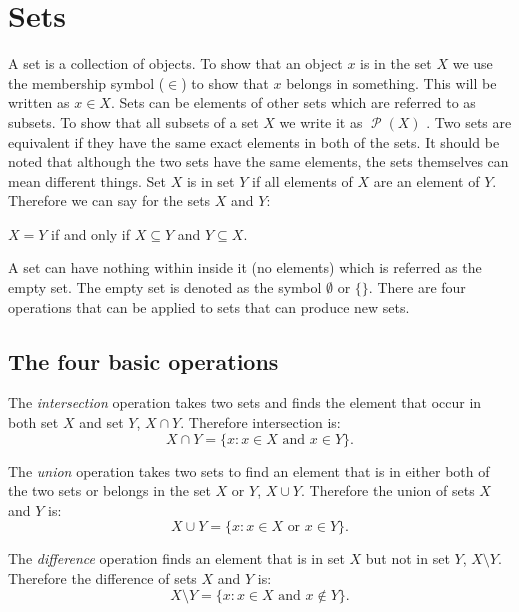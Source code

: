 \documentclass[11pt,a4paper]{article}
\DeclareMathOperator{\power}{\mathcal{P}}
\begin{document}
\section{Sets}
\label{sec:sets}

A set is a collection of objects. To show that an object $x$ is in the set $X$ we use the membership symbol ($\in$) to show that $x$ belongs in something. This will be written as $x \in X$. Sets can be elements of other sets which are referred to as subsets. To show that all subsets of a set $X$ we write it as $\power(X)$ \cite{Marek2009Introduction}. Two sets are equivalent if they have the same exact elements in both of the sets. It should be noted that although the two sets have the same elements, the sets themselves can mean different things. Set $X$ is in set $Y$ if all elements of $X$ are an element of $Y$.
Therefore we can say for the sets $X$ and $Y$:
\begin{center}
  $X=Y$ if and only if $X \subseteq Y$ and $Y \subseteq X$.
\end{center}
A set can have nothing within inside it (no elements) which is referred as the empty set. The empty set is denoted as the symbol $\emptyset$ or $\{\}$. There are four operations that can be applied to sets that can produce new sets.  

\subsection{The four basic operations}
\label{sec:fourbasop}

The \emph{intersection} operation takes two sets and finds the element that occur in both set $X$ and set $Y$, $X \cap Y$. Therefore intersection is:
\begin{displaymath}
  X \cap Y = \{x : x \in X  \text{ and } x \in Y\}.
\end{displaymath}

The \emph{union} operation takes two sets to find an element that is in either both of the two sets or belongs in the set $X$ or $Y$, $X \cup Y$. Therefore the union of sets $X$ and $Y$ is:
\begin{displaymath}
  X \cup Y = \{x : x \in X  \text{ or } x \in Y\}.
\end{displaymath}

The \emph{difference} operation finds an element that is in set $X$ but not in set $Y$, $X \setminus Y$. Therefore the difference of sets $X$ and $Y$ is:
\begin{displaymath}
  X \setminus Y = \{x : x \in X  \text{ and } x \notin Y\}.
\end{displaymath}
\end{document}
